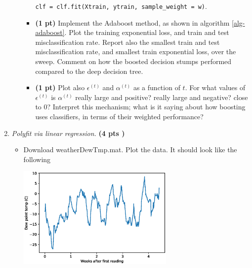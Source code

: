 \documentclass{article}
\newcommand{\showpoints}[1]{\textbf{(#1)}}
\begin{document}
\begin{enumerate}
\begin{enumerate}
\begin{itemize}
\begin{center}
\texttt{clf = clf.fit(Xtrain, ytrain, sample\_weight = w)}.
\end{center}




\item  \showpoints{1 pt}
Implement the Adaboost method, as shown in algorithm \ref{alg-adaboost}. Plot the training exponential loss, and train and test misclassification  rate. 
Report also the smallest  train and test misclassification rate, and smallest train exponential loss, over the sweep. Comment on how the boosted decision stumps performed compared to the deep decision tree.




\item \showpoints{1 pt}
Plot also $\epsilon^{(t)}$ and $\alpha^{(t)}$ as a function of $t$. For what values of $\epsilon^{(t)}$ is $\alpha^{(t)}$ really large and positive? really large and negative? close to 0? Interpret this mechanism; what is it saying about how boosting uses classifiers, in terms of their weighted performance?





\end{itemize}



\end{enumerate}


\item \emph{Polyfit via linear regression.} \showpoints{4 pts } 

\begin{itemize}
\item Download weatherDewTmp.mat. Plot the data. It should look like the following
\begin{center}
\includegraphics[width=3in]{polyfit_figs/polyfit_hw1_0.eps}
\end{center}



\end{itemize}
\end{enumerate}
\end{document}
